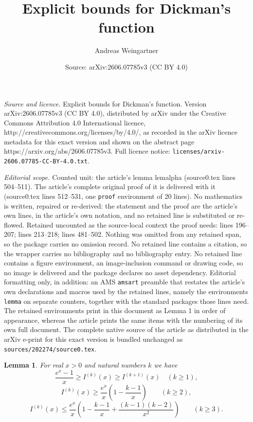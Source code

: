 \documentclass[10pt,a4paper]{amsart}
\title{Explicit bounds for Dickman's function}
\author{Andreas Weingartner}
\date{Source: arXiv:2606.07785v3 (CC BY 4.0)}
\newtheorem{lemma}{Lemma}
\begin{document}
\maketitle

\noindent\emph{Source and licence.} Explicit bounds for Dickman's function. Version arXiv:2606.07785v3 (CC BY 4.0), distributed by arXiv under the Creative Commons Attribution 4.0 International licence, http://creativecommons.org/licenses/by/4.0/, as recorded in the arXiv licence metadata for this exact version and shown on the abstract page https://arxiv.org/abs/2606.07785v3. Full licence notice: \texttt{licenses/arxiv-2606.07785-CC-BY-4.0.txt}.\par\smallskip

\noindent\textit{Editorial scope.} Counted unit: the article's lemma lemalpha (source0.tex lines 504--511). The article's complete original proof of it is delivered with it (source0.tex lines 512--531, one \texttt{proof} environment of 20 lines). No mathematics is written, repaired or re-derived: the statement and the proof are the article's own lines, in the article's own notation, and no retained line is substituted or re-flowed.  Retained uncounted as the source-local context the proof needs: lines 196--207; lines 213--218; lines 481--502.  Nothing was omitted from any retained span, so the package carries no omission record.  No retained line contains a citation, so the wrapper carries no bibliography and no bibliography entry.  No retained line contains a figure environment, an image-inclusion command or drawing code, so no image is delivered and the package declares no asset dependency.  Editorial formatting only, in addition: an AMS \texttt{amsart} preamble that restates the article's own declarations and macros used by the retained lines, namely the environments \texttt{lemma} on separate counters, together with the standard packages those lines need.  The retained environments print in this document as Lemma 1 in order of appearance, whereas the article prints the same items with the numbering of its own full document.  The complete native source of the article as distributed in the arXiv e-print for this exact version is bundled unchanged as \texttt{sources/202274/source0.tex}.
\begin{lemma}\label{lemIk}
For real $x>0$ and natural numbers $k$ we have 
$$
\frac{e^x -1}{x} \ge I^{(k)}(x) \ge I^{(k+1)}(x) \quad (k\ge 1),
$$
$$
I^{(k)}(x) \ge \frac{e^x}{x} \left(1-\frac{k-1}{x}\right) \qquad (k\ge 2),
$$
$$
I^{(k)}(x) \le  \frac{e^x}{x} \left(1-\frac{k-1}{x}+\frac{(k-1)(k-2)}{x^2}\right) \qquad (k\ge 3).
$$
\end{lemma}
\end{document}
